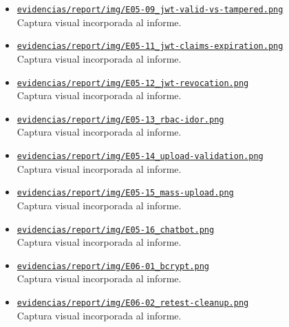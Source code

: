 \begin{itemize}[leftmargin=1.2em]
  {\small Captura visual incorporada al informe.}
  \item \href{https://github.com/gamurigm/inventrack-ptes-report/blob/main/evidencias/report/img/E05-09_jwt-valid-vs-tampered.png}{\nolinkurl{evidencias/report/img/E05-09_jwt-valid-vs-tampered.png}}\\
  {\small Captura visual incorporada al informe.}
  \item \href{https://github.com/gamurigm/inventrack-ptes-report/blob/main/evidencias/report/img/E05-11_jwt-claims-expiration.png}{\nolinkurl{evidencias/report/img/E05-11_jwt-claims-expiration.png}}\\
  {\small Captura visual incorporada al informe.}
  \item \href{https://github.com/gamurigm/inventrack-ptes-report/blob/main/evidencias/report/img/E05-12_jwt-revocation.png}{\nolinkurl{evidencias/report/img/E05-12_jwt-revocation.png}}\\
  {\small Captura visual incorporada al informe.}
  \item \href{https://github.com/gamurigm/inventrack-ptes-report/blob/main/evidencias/report/img/E05-13_rbac-idor.png}{\nolinkurl{evidencias/report/img/E05-13_rbac-idor.png}}\\
  {\small Captura visual incorporada al informe.}
  \item \href{https://github.com/gamurigm/inventrack-ptes-report/blob/main/evidencias/report/img/E05-14_upload-validation.png}{\nolinkurl{evidencias/report/img/E05-14_upload-validation.png}}\\
  {\small Captura visual incorporada al informe.}
  \item \href{https://github.com/gamurigm/inventrack-ptes-report/blob/main/evidencias/report/img/E05-15_mass-upload.png}{\nolinkurl{evidencias/report/img/E05-15_mass-upload.png}}\\
  {\small Captura visual incorporada al informe.}
  \item \href{https://github.com/gamurigm/inventrack-ptes-report/blob/main/evidencias/report/img/E05-16_chatbot.png}{\nolinkurl{evidencias/report/img/E05-16_chatbot.png}}\\
  {\small Captura visual incorporada al informe.}
  \item \href{https://github.com/gamurigm/inventrack-ptes-report/blob/main/evidencias/report/img/E06-01_bcrypt.png}{\nolinkurl{evidencias/report/img/E06-01_bcrypt.png}}\\
  {\small Captura visual incorporada al informe.}
  \item \href{https://github.com/gamurigm/inventrack-ptes-report/blob/main/evidencias/report/img/E06-02_retest-cleanup.png}{\nolinkurl{evidencias/report/img/E06-02_retest-cleanup.png}}\\
  {\small Captura visual incorporada al informe.}
\end{itemize}

